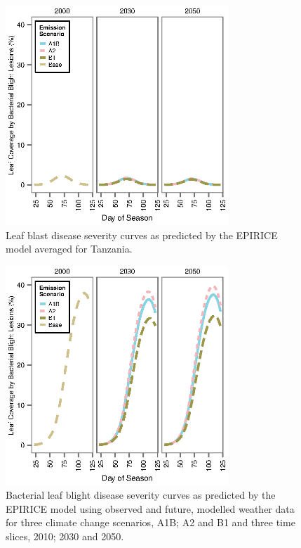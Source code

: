     \begin{figure}
      \includegraphics[width = 84mm]{figures/LB}
      \caption{Leaf blast disease severity curves as predicted by the EPIRICE model averaged for Tanzania.}
        \label{LBCurves}
    \end{figure}
    
    \begin{figure}
      \includegraphics[width = 84mm]{figures/BB}
      \caption{Bacterial leaf blight disease severity curves as predicted by the EPIRICE model using observed and future, modelled weather data for three climate change scenarios, A1B; A2 and B1 and three time slices, 2010; 2030 and 2050.}
        \label{BBCurves}
    \end{figure}
    
